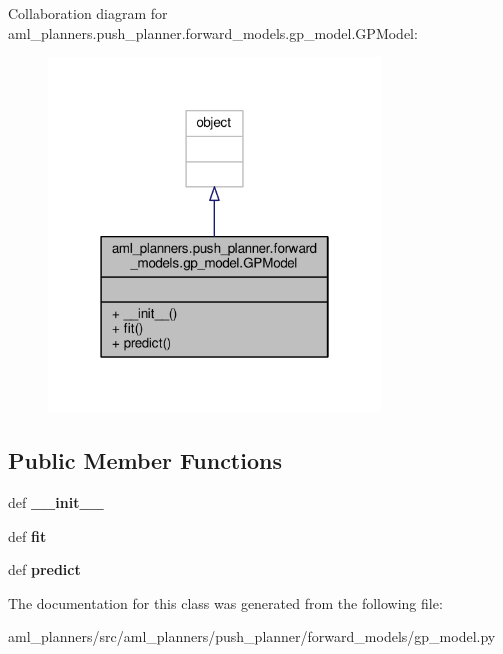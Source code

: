 Collaboration diagram for aml\-\_\-planners.\-push\-\_\-planner.\-forward\-\_\-models.\-gp\-\_\-model.\-G\-P\-Model\-:\nopagebreak
\begin{figure}[H]
\begin{center}
\leavevmode
\includegraphics[width=250pt]{classaml__planners_1_1push__planner_1_1forward__models_1_1gp__model_1_1_g_p_model__coll__graph}
\end{center}
\end{figure}
\subsection*{Public Member Functions}
\begin{DoxyCompactItemize}
\item 
\hypertarget{classaml__planners_1_1push__planner_1_1forward__models_1_1gp__model_1_1_g_p_model_adccf633c02f85d4857f089d091c98c30}{def {\bfseries \-\_\-\-\_\-init\-\_\-\-\_\-}}\label{classaml__planners_1_1push__planner_1_1forward__models_1_1gp__model_1_1_g_p_model_adccf633c02f85d4857f089d091c98c30}

\item 
\hypertarget{classaml__planners_1_1push__planner_1_1forward__models_1_1gp__model_1_1_g_p_model_aa4d91e4b6384f2eeb961bfea087d631d}{def {\bfseries fit}}\label{classaml__planners_1_1push__planner_1_1forward__models_1_1gp__model_1_1_g_p_model_aa4d91e4b6384f2eeb961bfea087d631d}

\item 
\hypertarget{classaml__planners_1_1push__planner_1_1forward__models_1_1gp__model_1_1_g_p_model_aef716b47cb802713bd09e9265b3ed541}{def {\bfseries predict}}\label{classaml__planners_1_1push__planner_1_1forward__models_1_1gp__model_1_1_g_p_model_aef716b47cb802713bd09e9265b3ed541}

\end{DoxyCompactItemize}


The documentation for this class was generated from the following file\-:\begin{DoxyCompactItemize}
\item 
aml\-\_\-planners/src/aml\-\_\-planners/push\-\_\-planner/forward\-\_\-models/gp\-\_\-model.\-py\end{DoxyCompactItemize}
